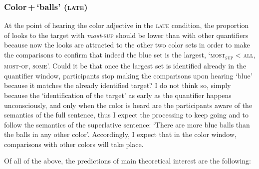 \documentclass[output=paper]{langscibook}
\begin{document}
\subsubsection{Color\,+\,`balls' (\textsc{late})}

At the point of hearing the color adjective in the \textsc{late} condition, the proportion of looks to the target with
\textit{most}\textsc{-sup} should be lower than with other quantifiers because now the looks are attracted to the
other two color sets in order to make the comparisons to confirm that indeed the blue set is the largest,
`\textsc{most\textsubscript{sup}} {\textless} \textsc{all}, \textsc{most-of}, \textsc{some}'. Could it be that once the
largest set is identified already in the quantifier window, participants stop making the comparisons upon hearing `blue' because it matches the already identified target? I do not think so, simply because the `identification of the target' as early as the quantifier happens unconsciously, and only when the color is heard are the participants aware of the semantics of the full sentence, thus I expect the processing to keep going and to follow the semantics of the
superlative sentence: `There are more blue balls than the balls in any other color'. Accordingly, I expect that in the color window, comparisons with other colors will take place.

Of all of the above, the predictions of main theoretical interest are the following: 
\end{document}
